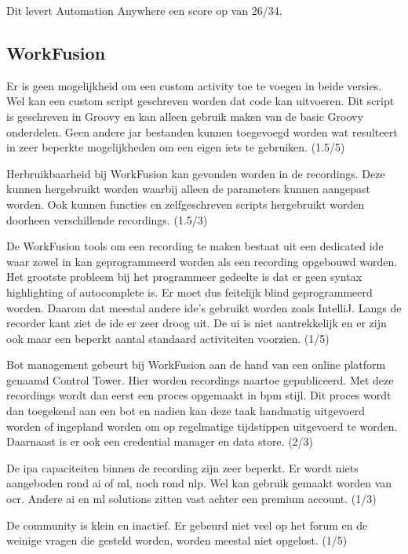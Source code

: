 Dit levert Automation Anywhere een score op van 26/34.

\subsection{WorkFusion}

Er is geen mogelijkheid om een custom activity toe te voegen in beide versies. Wel kan een custom script geschreven worden dat code kan uitvoeren. Dit script is geschreven in Groovy en kan alleen gebruik maken van de basic Groovy onderdelen. Geen andere jar bestanden kunnen toegevoegd worden wat resulteert in zeer beperkte mogelijkheden om een eigen iets te gebruiken. (1.5/5)

Herbruikbaarheid bij WorkFusion kan gevonden worden in de recordings. Deze kunnen hergebruikt worden waarbij alleen de parameters kunnen aangepast worden. Ook kunnen functies en zelfgeschreven scripts hergebruikt worden doorheen verschillende recordings. (1.5/3)

De WorkFusion tools om een recording te maken bestaat uit een dedicated \acrlong{ide} waar zowel in kan geprogrammeerd worden als een recording opgebouwd worden. Het grootste probleem bij het programmeer gedeelte is dat er geen syntax highlighting of autocomplete is. Er moet dus feitelijk blind geprogrammeerd worden. Daarom dat meestal andere \acrshort{ide}'s gebruikt worden zoals IntelliJ. Langs de recorder kant ziet de \acrshort{ide} er zeer droog uit. De \acrfull{ui} is niet aantrekkelijk en er zijn ook maar een beperkt aantal standaard \gls{activiteit}en voorzien. (1/5)

Bot management gebeurt bij WorkFusion aan de hand van een online platform genaamd Control Tower. Hier worden recordings naartoe gepubliceerd. Met deze recordings wordt dan eerst een proces opgemaakt in \acrshort{bpm} stijl. Dit proces wordt dan toegekend aan een bot en nadien kan deze taak handmatig uitgevoerd worden of ingepland worden om op regelmatige tijdstippen uitgevoerd te worden. Daarnaast is er ook een credential manager en data store. (2/3)

De \acrshort{ipa} capaciteiten binnen de recording zijn zeer beperkt. Er wordt niets aangeboden rond \acrshort{ai} of \acrshort{ml}, noch rond \acrshort{nlp}. Wel kan gebruik gemaakt worden van \acrshort{ocr}. Andere \acrshort{ai} en \acrshort{ml} solutions zitten vast achter een premium account. (1/3)

De community is klein en inactief. Er gebeurd niet veel op het forum en de weinige vragen die gesteld worden, worden meestal niet opgelost. (1/5)

